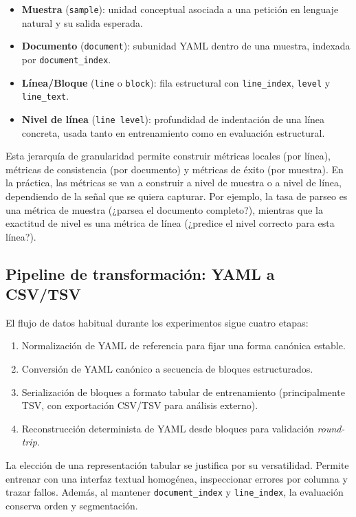 \begin{itemize}
\item \textbf{Muestra} (\texttt{sample}): unidad conceptual asociada a una petición en lenguaje natural y su salida esperada.
\item \textbf{Documento} (\texttt{document}): subunidad YAML dentro de una muestra, indexada por \texttt{document\_index}.
\item \textbf{Línea/Bloque} (\texttt{line} o \texttt{block}): fila estructural con \texttt{line\_index}, \texttt{level} y \texttt{line\_text}.
\item \textbf{Nivel de línea} (\texttt{line level}): profundidad de indentación de una línea concreta, usada tanto en entrenamiento como en evaluación estructural.
\end{itemize}

Esta jerarquía de granularidad permite construir métricas locales (por línea), métricas de consistencia (por documento) y métricas de éxito (por muestra).
En la práctica, las métricas se van a construir a nivel de muestra o a nivel de línea, dependiendo de la señal que se quiera capturar. Por ejemplo, la tasa de parseo
es una métrica de muestra (¿parsea el documento completo?), mientras que la exactitud de nivel es una métrica de línea (¿predice el nivel correcto para esta línea?).

\subsection{Pipeline de transformación: YAML a CSV/TSV}
\label{sec:ch4_pipeline}

El flujo de datos habitual durante los experimentos sigue cuatro etapas:

\begin{enumerate}
\item Normalización de YAML de referencia para fijar una forma canónica estable.
\item Conversión de YAML canónico a secuencia de bloques estructurados.
\item Serialización de bloques a formato tabular de entrenamiento (principalmente TSV, con exportación CSV/TSV para análisis externo).
\item Reconstrucción determinista de YAML desde bloques para validación \textit{round-trip}.
\end{enumerate}

La elección de una representación tabular se justifica por su versatilidad. Permite entrenar con una interfaz textual homogénea, inspeccionar errores por columna y trazar
fallos. Además, al mantener \texttt{document\_index} y \texttt{line\_index}, la evaluación conserva orden y segmentación.

